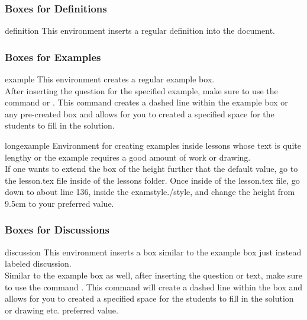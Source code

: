 \documentclass[12pt,hidelinks]{article}
\begin{document}
		\subsubsection{Boxes for Definitions}
			\begin{docEnvironment}{definition}{}
				This environment  inserts a regular definition into the document. 
			\end{docEnvironment}
		\subsubsection{Boxes for Examples}
			\begin{docEnvironment}{example}{}
				This environment  creates a regular example box. \\
				After inserting the question for the specified example, make sure to use the command  or . This command creates a dashed line within the example box or any pre-created box and allows for you to created a specified space for the students to fill in the solution. 
			\end{docEnvironment}
			\begin{docEnvironment}{longexample}{}
				Environment for creating examples inside lessons whose text is quite lengthy or the example requires a good amount of work or drawing. \\
				If one wants to extend the box of the height further that the default value, go to the lesson.tex file inside of the lessons folder. Once inside of the lesson.tex file, go down to about line 136, inside the examstyle./style, and change the height from 9.5cm to your preferred value. 
			\end{docEnvironment}
		\subsubsection{Boxes for Discussions}
			\begin{docEnvironment}{discussion}{}
				This environment inserts a box similar to the example box just instead labeled discussion. \\ 
				Similar to the example box as well, after inserting the question or text, make sure to use the command . This command will create a dashed line within the box and allows for you to created a specified space for the students to fill in the solution or drawing etc. preferred value. 
			\end{docEnvironment}
\end{document}

